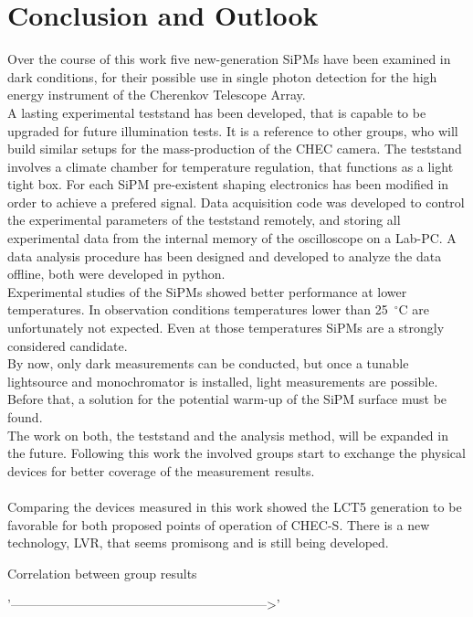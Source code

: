 \documentclass[12pt,article,type=msc,colorback,accentcolor=tud9c]{tudthesis}
\begin{document}
\section{\Large Conclusion and Outlook}

Over the course of this work five new-generation SiPMs have been examined in dark conditions, for their possible use in single photon detection for the high energy instrument of the Cherenkov Telescope Array.\\
A lasting experimental teststand has been developed, that is capable to be upgraded for future illumination tests. It is a reference to other groups, who will build similar setups for the mass-production of the CHEC camera. The teststand involves a climate chamber for temperature regulation, that functions as a light tight box. For each SiPM pre-existent shaping electronics has been modified in order to achieve a prefered signal. Data acquisition code was developed to control the experimental parameters of the teststand remotely, and storing all experimental data from the internal memory of the oscilloscope on a Lab-PC. A data analysis procedure has been designed and developed to analyze the data offline, both were developed in python.\\
Experimental studies of the SiPMs showed better performance at lower temperatures. In observation conditions temperatures lower than 25~$^\circ$C are unfortunately not expected. Even at those temperatures SiPMs are a strongly considered candidate.\\
By now, only dark measurements can be conducted, but once a tunable lightsource and monochromator is installed, light measurements are possible. Before that, a solution for the potential warm-up of the SiPM surface must be found.\\
The work on both, the teststand and the analysis method, will be expanded in the future. Following this work the involved groups start to exchange the physical devices for better coverage of the measurement results.\\\\
Comparing the devices measured in this work showed the LCT5 generation to be favorable for both proposed points of operation of CHEC-S. There is a new technology, LVR, that seems promisong and is still being developed. 


Correlation between group results


'------------------------------------------------------------>'
\end{document}
